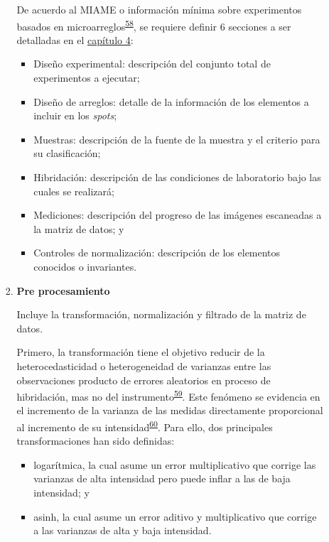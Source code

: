 \documentclass[]{article}
\providecommand{\tightlist}{%
  \setlength{\itemsep}{0pt}\setlength{\parskip}{0pt}}
\begin{document}
\begin{enumerate}
\begin{enumerate}
\begin{enumerate}
      De acuerdo al MIAME o información mínima sobre experimentos
      basados en
      microarreglos\textsuperscript{\protect\hyperlink{ref-brazma2001}{58}},
      se requiere definir 6 secciones a ser detalladas en el
      \protect\hyperlink{meto}{capítulo 4}:

      \begin{itemize}
      \tightlist
      \item
        Diseño experimental: descripción del conjunto total de
        experimentos a ejecutar;
      \item
        Diseño de arreglos: detalle de la información de los elementos a
        incluir en los \emph{spots};
      \item
        Muestras: descripción de la fuente de la muestra y el criterio
        para su clasificación;
      \item
        Hibridación: descripción de las condiciones de laboratorio bajo
        las cuales se realizará;
      \item
        Mediciones: descripción del progreso de las imágenes escaneadas
        a la matriz de datos; y
      \item
        Controles de normalización: descripción de los elementos
        conocidos o invariantes.
      \end{itemize}
    \item
      \textbf{Pre procesamiento}

      Incluye la transformación, normalización y filtrado de la matriz
      de datos.

      Primero, la transformación tiene el objetivo reducir de la
      heterocedasticidad o heterogeneidad de varianzas entre las
      observaciones producto de errores aleatorios en proceso de
      hibridación, mas no del
      instrumento\textsuperscript{\protect\hyperlink{ref-kreil2005bullet}{59}}.
      Este fenómeno se evidencia en el incremento de la varianza de las
      medidas directamente proporcional al incremento de su
      intensidad\textsuperscript{\protect\hyperlink{ref-brown2001image}{60}}.
      Para ello, dos principales transformaciones han sido definidas:

      \begin{itemize}
      \tightlist
      \item
        logarítmica, la cual asume un error multiplicativo que corrige
        las varianzas de alta intensidad pero puede inflar a las de baja
        intensidad; y
      \item
        asinh, la cual asume un error aditivo y multiplicativo que
        corrige a las varianzas de alta y baja intensidad.
      \end{itemize}


\end{enumerate}
\end{enumerate}
\end{enumerate}
\end{document}
